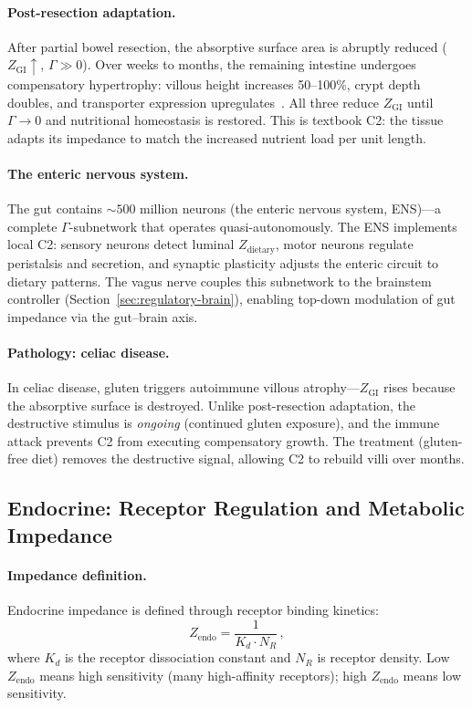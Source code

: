 \documentclass[aps,pre,twocolumn,superscriptaddress,floatfix]{revtex4-2}
\begin{document}
\paragraph{Post-resection adaptation.}
After partial bowel resection, the absorptive
surface area is abruptly reduced ($Z_{\text{GI}}
\uparrow$, $\Gamma \gg 0$).
Over weeks to months, the remaining intestine
undergoes compensatory hypertrophy:
villous height increases 50--100\%, crypt depth
doubles, and transporter expression
upregulates~\cite{Tappenden2014}.
All three reduce $Z_{\text{GI}}$ until
$\Gamma \to 0$ and nutritional homeostasis is
restored.  This is textbook C2: the tissue
adapts its impedance to match the increased
nutrient load per unit length.

\paragraph{The enteric nervous system.}
The gut contains $\sim 500$ million neurons
(the enteric nervous system, ENS)---a
complete $\Gamma$-subnetwork that operates
quasi-autonomously.  The ENS implements local C2:
sensory neurons detect luminal $Z_{\text{dietary}}$,
motor neurons regulate peristalsis and secretion,
and synaptic plasticity adjusts the
enteric circuit to dietary patterns.
The vagus nerve couples this subnetwork to the
brainstem controller (Section~\ref{sec:regulatory-brain}),
enabling top-down modulation of gut impedance
via the gut--brain axis.

\paragraph{Pathology: celiac disease.}
In celiac disease, gluten triggers autoimmune
villous atrophy---$Z_{\text{GI}}$ rises
because the absorptive surface is destroyed.
Unlike post-resection adaptation, the destructive
stimulus is \emph{ongoing} (continued gluten exposure),
and the immune attack prevents C2 from executing
compensatory growth.  The treatment (gluten-free diet)
removes the destructive signal, allowing C2 to
rebuild villi over months.


\subsection{Endocrine: Receptor Regulation and Metabolic Impedance}
\label{sec:endocrine}

\paragraph{Impedance definition.}
Endocrine impedance is defined through receptor
binding kinetics:
\begin{equation}
  Z_{\text{endo}} = \frac{1}{K_d \cdot N_R}\,,
  \label{eq:z-endo}
\end{equation}
where $K_d$ is the receptor dissociation constant
and $N_R$ is receptor density.
Low $Z_{\text{endo}}$ means high sensitivity
(many high-affinity receptors);
high $Z_{\text{endo}}$ means low sensitivity.
\end{document}
